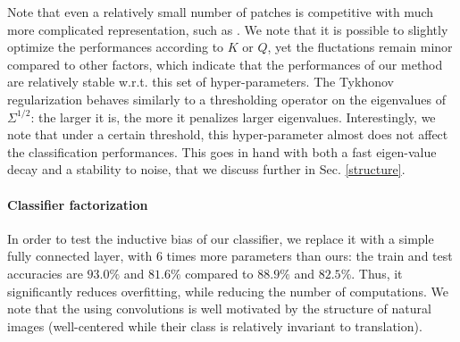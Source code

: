 \documentclass{article}
\newcommand{\Edouard}[1]{\textcolor{blue}{#1}}
\begin{document}

Note that even a relatively small number of patches is competitive with much more complicated representation, such as \citet{Oyallon_2015_CVPR}.
We note that it is possible to slightly optimize the performances according to $K$ or $Q$, yet the fluctations remain minor compared to other factors, which indicate that the performances of our method are relatively stable w.r.t. this set of hyper-parameters. The Tykhonov regularization behaves similarly to a thresholding operator on the eigenvalues of $\Sigma^{1/2}$: the larger it is, the more it penalizes larger eigenvalues. Interestingly, we note that under a certain threshold, this hyper-parameter almost does not affect the classification performances. This goes in hand with both a fast eigen-value decay and a stability to noise, that we discuss further in Sec. \ref{structure}.

\paragraph{Classifier factorization}
In order to test the inductive bias of our classifier, we  replace it with a simple fully connected layer, with $6$ times more parameters than ours: the train and test accuracies are $93.0\%$ and $81.6\%$ compared to $88.9\%$ and $82.5\%$. Thus, it significantly reduces overfitting, while reducing the number of computations. We note that the using convolutions is well motivated by the  structure of natural images (well-centered while their class is relatively invariant to translation).
\end{document}
